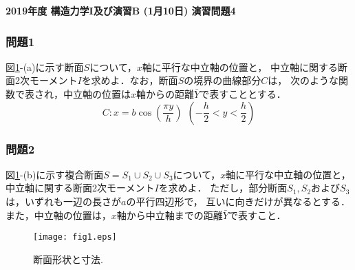 \documentclass[10pt,a4j]{jarticle}
\newlength{\minitwocolumn}
\begin{document}
\newcommand{\fat}[1]{\mbox{\boldmath $#1$}}
\newcommand{\D}{\partial}
\newcommand{\w}{\omega}
\newcommand{\ga}{\alpha}
\newcommand{\gb}{\beta}
\newcommand{\gx}{\xi}
\newcommand{\gz}{\zeta}
\newcommand{\vhat}[1]{\hat{\fat{#1}}}
\newcommand{\spc}{\vspace{0.7\baselineskip}}
\newcommand{\halfspc}{\vspace{0.3\baselineskip}}

\pagestyle{empty}
\newcommand{\twofig}[2]
 {
   \begin{figure}[h]
     \begin{minipage}[t]{\minitwocolumn}
         \begin{center}   #1
         \end{center}
     \end{minipage}
         \hspace{\columnsep}
     \begin{minipage}[t]{\minitwocolumn}
         \begin{center} #2
         \end{center}
     \end{minipage}
   \end{figure}
 }
\begin{center}
{\Large \bf 2019年度 構造力学I及び演習B (1月10日) 演習問題4} \\
\end{center}
\subsubsection*{問題1}
図\ref{fig:fig1}-(a)に示す断面$S$について，$x$軸に平行な中立軸の位置と，
中立軸に関する断面2次モーメント$I$を求めよ．なお，断面$S$の境界の曲線部分$C$は，
次のような関数で表され，中立軸の位置は$x$軸からの距離$\bar{Y}$で表すこととする．
\begin{equation}
	C: x=b \cos \left( \frac{\pi y}{h}\right) 
	\ \ \left(-\frac{h}{2} < y < \frac{h}{2} \right)
\end{equation}
\subsubsection*{問題2}
図\ref{fig:fig1}-(b)に示す複合断面$S=S_1\cup S_2 \cup S_3$について，$x$軸に平行な中立軸の位置と，
中立軸に関する断面2次モーメント$I$を求めよ．
ただし，部分断面$S_1,S_2$および$S_3$は，いずれも一辺の長さが$a$の平行四辺形で，
互いに向きだけが異なるとする．また，中立軸の位置は，$x$軸から中立軸までの距離$\bar{Y}$で表すこと．

\vspace{15mm}
\begin{figure}[h]
	\begin{center}
	\texttt{[image: fig1.eps]} 
	\end{center}
	\caption{断面形状と寸法.} 
	\label{fig:fig1}
\end{figure}
\end{document}
